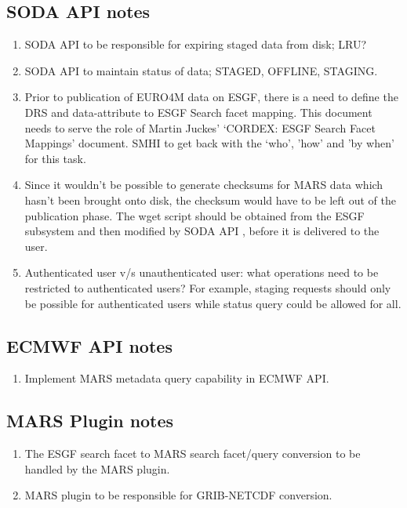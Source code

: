 \documentclass[oneside,12pt]{memoir}
\def\phname{SODA API{ }}
\begin{document}
\subsection{\phname notes}
\begin{enumerate}
\item \phname to be responsible for expiring staged data from disk; LRU?
\item \phname to maintain status of data; STAGED, OFFLINE, STAGING. 
\item Prior to publication of EURO4M data on ESGF, there is a need to define the DRS and data-attribute to ESGF Search facet mapping. This document needs to serve the role of Martin Juckes' `CORDEX: ESGF Search Facet Mappings' document. SMHI to get back with the `who', 'how' and 'by when' for this task.
\item Since it wouldn't be possible to generate checksums for MARS data which hasn't been brought onto disk, the checksum would have to be left out of the publication phase. The wget script should be obtained from the ESGF subsystem and then modified by \phname, before it is delivered to the user.
\item Authenticated user v/s unauthenticated user: what operations need to be restricted to authenticated users? For example, staging requests should only be possible for authenticated users while status query could be allowed for all.
\end{enumerate}

\subsection{ECMWF API notes}
\begin{enumerate}
\item Implement MARS metadata query capability in ECMWF API.
\end{enumerate}
\subsection{MARS Plugin notes}
\begin{enumerate}
\item The ESGF search facet to MARS search facet/query conversion to be handled by the MARS plugin.
\item MARS plugin to be responsible for GRIB-NETCDF conversion.
\end{enumerate}

\appendix
{}
\setcounter{secnumdepth}{0}
\end{document}
